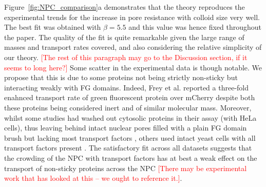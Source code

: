 \documentclass[12pt, a4paper]{article}
\newcommand\todo[1]{\textcolor{red}{#1}}
\begin{document}
Figure~\ref{fig:NPC_comparison}a demonstrates that the theory reproduces the experimental trends for the increase in pore resistance with colloid size very well.
The best fit was obtained with $\beta = 5.5$ and this value was hence fixed  throughout the paper.
The quality of the fit is quite remarkable given the large range of masses and transport rates covered, and also considering the relative simplicity of our theory.
\todo{[The rest of this paragraph may  go to the Discussion section, if it seems to long here?]}
Some scatter in the experimental data is though notable.
We propose that this is due to some proteins not being strictly non-sticky but interacting weakly with FG domains.
Indeed, Frey et al. \cite{Frey2018} reported a three-fold enahnced transport rate of green fluorescent protein over mCherry despite both these proteins being considered inert and of similar molecular mass.
Moreover, whilst some studies had washed out cytosolic proteins in their assay (with HeLa cells), thus leaving behind intact nuclear pores filled with a plain FG domain brush but lacking most transport factors \cite{Ribbeck2001, Mohr2009, Frey2018}, others used intact yeast cells with all transport factors present \cite{Popken2015, Timney2016}.
The satisfactory fit across all datasets suggests that the crowding of the NPC with transport factors has at best a weak effect on the transport of non-sticky proteins across the NPC \todo{[There may be experimental work that has looked at this -- we ought to reference it.]}.  
\end{document}
